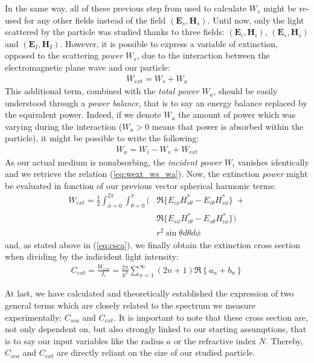 \documentclass{article}
\numberwithin{equation}{section}
\begin{document}
In the same way, all of these previous step from used to calculate $W_{s}$ might be re-used for any other fields instead of the field $(\textbf{E}_{s}, \textbf{H}_{s})$. Until now, only the light scattered by the particle was studied thanks to three fields: $(\textbf{E}_{i}, \textbf{H}_{i})$, $(\textbf{E}_{s}, \textbf{H}_{s})$ and $(\textbf{E}_{I}, \textbf{H}_{I})$. However, it is possible to express a variable of extinction, opposed to the scattering \textit{power} $W_{s}$, due to the interaction between the electromagnetic plane wave and our particle:
\begin{align}\label{eq:wext_ws_wa}
W_{ext} = W_{s} + W_{a}
\end{align}
This additional term, combined with the \textit{total power} $W_{a}$, should be easily understood through a \textit{power balance}, that is to say an energy balance replaced by the equivalent power. Indeed, if we denote $W_{a}$ the amount of power which was varying during the interaction ($W_{a} > 0$ means that power is absorbed within the particle), it might be possible to write the following:
\begin{align}
W_{a} = W_{i} - W_{s} + W_{ext}
\end{align}
As our actual medium is nonabsorbing, the \textit{incident power} $W_{i}$ vanishes identically and we retrieve the relation (\ref{eq:wext_ws_wa}). Now, the extinction \textit{power} might be evaluated in fonction of our previous vector spherical harmonic terms:
\begin{equation}
\begin{aligned}
W_{ext}=\frac{1}{2}\int_{\phi=0}^{2\pi}\int_{\theta=0}^{\pi} (&\Re\{E_{i\phi}H^{*}_{s\theta} - E_{i\theta}H^{*}_{s\phi}\}\; +\\
&\Re\{E_{s\phi}H^{*}_{i\theta} - E_{s\theta}H^{*}_{i\phi}\}) \\
&r^{2}\sin\theta d\theta d\phi
\end{aligned}
\end{equation}
and, as stated above in (\ref{eq:csca}), we finally obtain the extinction cross section when dividing by the indicident light intensity:
\begin{align}\label{eq:cext}
C_{ext}=\frac{W_{ext}}{I_{i}}=\frac{2\pi}{k^{2}}\sum_{n=1}^{\infty }(2n+1)\Re\left\{a_{n} + b_{n} \right\}
\end{align}

At last, we have calculated and theoretically established the expression of two general terms which are closely related to the spectrum we measure experimentally: $C_{sca}$ and $C_{ext}$. It is important to note that these cross section are, not only dependent on, but also strongly linked to our starting assumptions, that is to say our input variables like the radius $a$ or the refractive index $N$. Thereby, $C_{sca}$ and $C_{ext}$ are directly reliant on the size of our studied particle.
\end{document}

